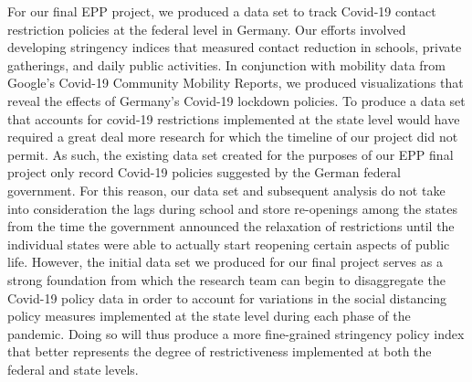 For our final EPP project, we produced a data set to track Covid-19 contact restriction policies at the federal level in Germany. Our efforts involved developing stringency indices that measured contact reduction in schools, private gatherings, and daily public activities. In conjunction with mobility data from Google’s Covid-19 Community Mobility Reports, we produced visualizations that reveal the effects of Germany’s Covid-19 lockdown policies. To produce a data set that accounts for covid-19 restrictions implemented at the state level would have required a great deal more research for which the timeline of our project did not permit. As such, the existing data set created for the purposes of our EPP final project only record Covid-19 policies suggested by the German federal government. For this reason, our data set and subsequent analysis do not take into consideration the lags during school and store re-openings among the states from the time the government announced the relaxation of restrictions until the individual states were able to actually start reopening certain aspects of public life. However, the initial data set we produced for our final project serves as a strong foundation from which the research team can begin to disaggregate the Covid-19 policy data in order to account for variations in the social distancing policy measures implemented at the state level during each phase of the pandemic. Doing so will thus produce a more fine-grained stringency policy index that better represents the degree of restrictiveness implemented at both the federal and state levels.
